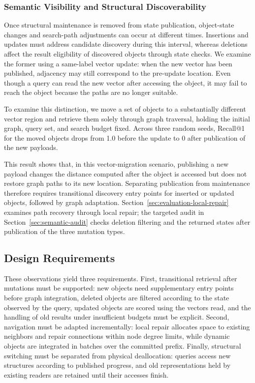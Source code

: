 \documentclass[sigconf,pbalance]{acmart}
\begin{document}
\subsubsection{Semantic Visibility and Structural Discoverability}
\label{sec:publication-repair}

Once structural maintenance is removed from state publication, object-state changes and search-path adjustments can occur at different times. Insertions and updates must address candidate discovery during this interval, whereas deletions affect the result eligibility of discovered objects through state checks. We examine the former using a same-label vector update: when the new vector has been published, adjacency may still correspond to the pre-update location. Even though a query can read the new vector after accessing the object, it may fail to reach the object because the paths are no longer suitable.

To examine this distinction, we move a set of objects to a substantially different vector region and retrieve them solely through graph traversal, holding the initial graph, query set, and search budget fixed. Across three random seeds, Recall@1 for the moved objects drops from 1.0 before the update to 0 after publication of the new payloads.

This result shows that, in this vector-migration scenario, publishing a new payload changes the distance computed after the object is accessed but does not restore graph paths to its new location. Separating publication from maintenance therefore requires transitional discovery entry points for inserted or updated objects, followed by graph adaptation. Section~\ref{sec:evaluation-local-repair} examines path recovery through local repair; the targeted audit in Section~\ref{sec:semantic-audit} checks deletion filtering and the returned states after publication of the three mutation types.

\subsection{Design Requirements}
\label{sec:design-principles}

These observations yield three requirements. First, transitional retrieval after mutations must be supported: new objects need supplementary entry points before graph integration, deleted objects are filtered according to the state observed by the query, updated objects are scored using the vectors read, and the handling of old results under insufficient budgets must be explicit. Second, navigation must be adapted incrementally: local repair allocates space to existing neighbors and repair connections within node degree limits, while dynamic objects are integrated in batches over the committed prefix. Finally, structural switching must be separated from physical deallocation: queries access new structures according to published progress, and old representations held by existing readers are retained until their accesses finish.
\end{document}
